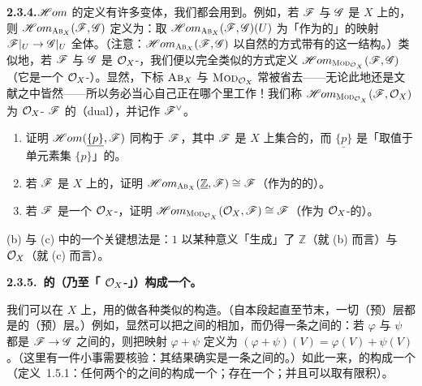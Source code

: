\textbf{2.3.4.}\quad $\mathscr{H}om$ 的定义有许多变体，我们都会用到。例如，若 $\mathscr{F}$ 与 $\mathscr{G}$ 是 $X$ 上\trAbelianGroups{}的\trSheaf，则 $\mathscr{H}om_{\textsc{Ab}_{X}}(\mathscr{F},\mathscr{G})$ 定义为：取 $\mathscr{H}om_{\textsc{Ab}_{X}}(\mathscr{F},\mathscr{G})(U)$ 为「作为\trAbelianGroups{}的\trSheaf{}」的映射 $\mathscr{F}|_U\to\mathscr{G}|_U$ 全体。（注意：$\mathscr{H}om_{\textsc{Ab}_{X}}(\mathscr{F},\mathscr{G})$ 以自然的方式带有\trAbelianGroups{}的\trSheaf{}这一结构。）类似地，若 $\mathscr{F}$ 与 $\mathscr{G}$ 是 $\mathcal{O}_X$-\trModule，我们便以完全类似的方式定义 $\mathscr{H}om_{\textsc{Mod}_{\mathcal{O}_X}}(\mathscr{F},\mathscr{G})$（它是一个 $\mathcal{O}_X$-\trModule）。显然，下标 $\textsc{Ab}_{X}$ 与 $\textsc{Mod}_{\mathcal{O}_X}$ 常被省去——无论此地还是文献之中皆然——所以务必当心自己正在哪个\trCategory{}里工作！我们称 $\mathscr{H}om_{\textsc{Mod}_{\mathcal{O}_X}}(\mathscr{F},\mathcal{O}_X)$ 为 $\mathcal{O}_X$-\trModule{} $\mathscr{F}$ 的\textbf{\trDual}（dual），并记作 $\mathscr{F}^{\vee}$。

\begin{exercise}\label{ex:sheaf-hom-reality-check}
\begin{enumerate}[label=(\alph*)]
\item 证明 $\mathscr{H}om(\underline{\{p\}},\mathscr{F})$ 同构于 $\mathscr{F}$，其中 $\mathscr{F}$ 是 $X$ 上集合的\trSheaf，而 $\underline{\{p\}}$ 是「取值于单元素集 $\{p\}$」的\trConstantSheaf。
\item 若 $\mathscr{F}$ 是 $X$ 上\trAbelianGroups{}的\trSheaf，证明 $\mathscr{H}om_{\textsc{Ab}_{X}}(\underline{\mathbb{Z}},\mathscr{F})\cong\mathscr{F}$（作为\trAbelianGroups{}的\trSheaf{}的\trIsomorphism）。
\item 若 $\mathscr{F}$ 是一个 $\mathcal{O}_X$-\trModule，证明 $\mathscr{H}om_{\textsc{Mod}_{\mathcal{O}_X}}(\mathcal{O}_X,\mathscr{F})\cong\mathscr{F}$（作为 $\mathcal{O}_X$-\trModule{}的\trIsomorphism）。
\end{enumerate}
\end{exercise}

(b) 与 (c) 中的一个关键想法是：$1$ 以某种意义「生成」了 $\mathbb{Z}$（就 (b) 而言）与 $\mathcal{O}_X$（就 (c) 而言）。

\textbf{2.3.5.\ \trAbelianGroups{}的\trPresheaf{}（乃至「\trPresheaf{} $\mathcal{O}_X$-\trModule」）构成一个\trAbelianCategory。}

我们可以在\trTopologicalSpace{} $X$ 上，用\trAbelianGroups{}的\trPresheaf{}做各种类似\trModule{}的构造。（自本段起直至节末，一切（预）层都是\trAbelianGroups{}的（预）层。）例如，显然可以把\trPresheaf{}之间的\trMorphism{}相加，而仍得一条\trPresheaf{}之间的\trMorphism：若 $\varphi$ 与 $\psi$ 都是\trPresheaf{} $\mathscr{F}\to\mathscr{G}$ 之间的\trMorphism，则把映射 $\varphi+\psi$ 定义为 $(\varphi+\psi)(V)=\varphi(V)+\psi(V)$。（这里有一件小事需要核验：其结果确实是一条\trPresheaf{}之间的\trMorphism。）如此一来，\trAbelianGroups{}的\trPresheaf{}构成一个\trAdditiveCategory{}（\mbox{定义~1.5.1}：任何两个\trAbelianGroups{}的\trPresheaf{}之间的\trMorphisms{}构成一个\trAbelianGroups；存在一个\trZeroObject；并且可以取有限积）。

